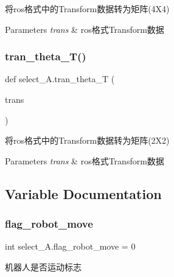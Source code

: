 将ros格式中的\+Transform数据转为矩阵(4\+X4) 


\begin{DoxyParams}{Parameters}
{\em trans} & ros格式\+Transform数据 \\
\hline
\end{DoxyParams}
\mbox{\label{namespaceselect___a_a810b4d9f7014249a97f5f10d65635eb8}} 
\subsubsection{\texorpdfstring{tran\+\_\+theta\+\_\+\+T()}{tran\_theta\_T()}}
{\footnotesize\ttfamily def select\+\_\+\+A.\+tran\+\_\+theta\+\_\+T (\begin{DoxyParamCaption}\item[{}]{trans }\end{DoxyParamCaption})}



将ros格式中的\+Transform数据转为矩阵(2\+X2) 


\begin{DoxyParams}{Parameters}
{\em trans} & ros格式\+Transform数据 \\
\hline
\end{DoxyParams}


\subsection{Variable Documentation}
\mbox{\label{namespaceselect___a_af5f7c62998c1bd067d53a259ca8a256c}} 
\subsubsection{\texorpdfstring{flag\+\_\+robot\+\_\+move}{flag\_robot\_move}}
{\footnotesize\ttfamily int select\+\_\+\+A.\+flag\+\_\+robot\+\_\+move = 0}



机器人是否运动标志 

\mbox{\label{namespaceselect___a_a328b1190c118d73685f2af988b949f28}} 
